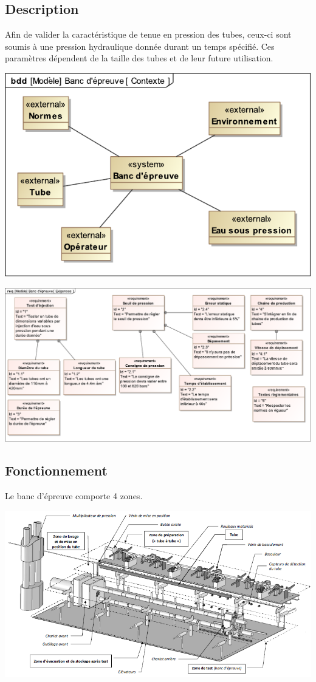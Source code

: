 \subsection{Description}

Afin de valider la caractéristique de tenue en pression des tubes, ceux-ci sont soumis à une pression hydraulique donnée durant un temps spécifié. Ces paramètres dépendent de la taille des tubes et de leur future utilisation.

\begin{center}
	\includegraphics[width=0.7\linewidth]{img/Banc_Contexte}
\end{center}

\begin{center}
	\includegraphics[width=0.9\linewidth]{img/Banc_Exigences}
\end{center}

\subsection{Fonctionnement}

Le banc d'épreuve comporte 4 zones.

\begin{center}
	\includegraphics[width=0.9\linewidth]{img/Annexe1}
\end{center}

